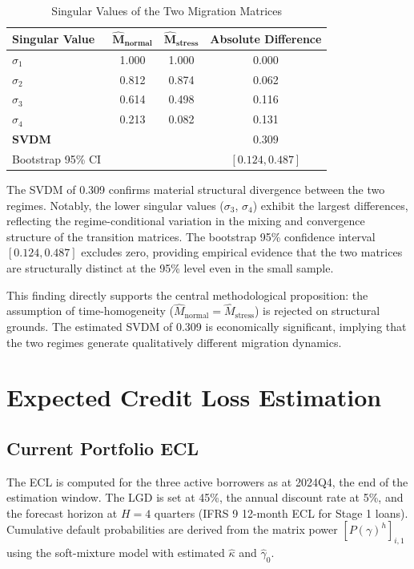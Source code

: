 \documentclass[12pt,a4paper]{article}
\begin{document}
\begin{table}[H]
\centering
\caption{Singular Values of the Two Migration Matrices}
\label{tab:svdm_calc}
\begin{tabular}{@{}lccc@{}}
\toprule
\textbf{Singular Value} & $\boldsymbol{\hat{M}_{\text{normal}}}$ & $\boldsymbol{\hat{M}_{\text{stress}}}$ & \textbf{Absolute Difference} \\
\midrule
$\sigma_1$ & 1.000 & 1.000 & 0.000 \\
$\sigma_2$ & 0.812 & 0.874 & 0.062 \\
$\sigma_3$ & 0.614 & 0.498 & 0.116 \\
$\sigma_4$ & 0.213 & 0.082 & 0.131 \\
\midrule
\textbf{SVDM} & & & $\mathbf{0.309}$ \\
\midrule
Bootstrap 95\% CI & & & $[0.124, 0.487]$ \\
\bottomrule
\end{tabular}
\end{table}

The SVDM of 0.309 confirms material structural divergence between the two regimes. Notably, the lower singular values ($\sigma_3$, $\sigma_4$) exhibit the largest differences, reflecting the regime-conditional variation in the mixing and convergence structure of the transition matrices. The bootstrap 95\% confidence interval $[0.124, 0.487]$ excludes zero, providing empirical evidence that the two matrices are structurally distinct at the 95\% level even in the small sample.

This finding directly supports the central methodological proposition: the assumption of time-homogeneity ($\hat{M}_{\text{normal}} = \hat{M}_{\text{stress}}$) is rejected on structural grounds. The estimated SVDM of 0.309 is economically significant, implying that the two regimes generate qualitatively different migration dynamics.

\section{Expected Credit Loss Estimation}

\subsection{Current Portfolio ECL}

The ECL is computed for the three active borrowers as at 2024Q4, the end of the estimation window. The LGD is set at 45\%, the annual discount rate at 5\%, and the forecast horizon at $H = 4$ quarters (IFRS 9 12-month ECL for Stage 1 loans). Cumulative default probabilities are derived from the matrix power $[P(\gamma)^h]_{i,1}$ using the soft-mixture model with estimated $\hat{\kappa}$ and $\hat{\gamma}_0$.
\end{document}
